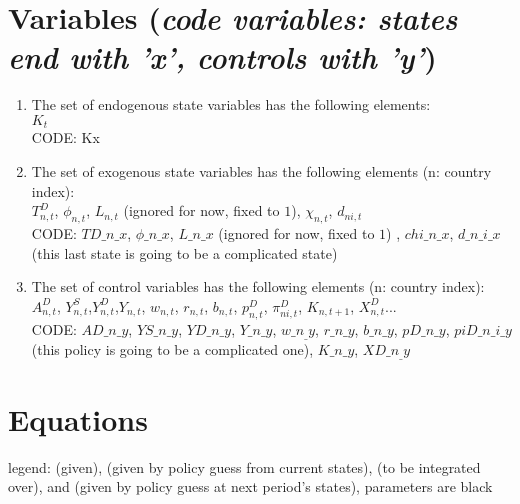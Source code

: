 \documentclass[11pt]{article}
\newcommand{\cl}[1]{{\color{orange}{#1}}}
\newcommand{\st}[1]{{\color{green}{#1}}}
\newcommand{\stnext}[1]{{\color{magenta}{#1}}}
\newcommand{\clnext}[1]{{\color{blue}{#1}}}
\begin{document}

\section{Variables (\emph{code variables: states end with 'x', controls with 'y'})}

\begin{enumerate}
	\item The set of endogenous state variables has the following elements: \\
	 $K_t$\\
	 CODE: Kx 
	\item The set of exogenous state variables has the following elements (n: country index): \\
	 $T^D_{n,t}$, $\phi_{n,t}$, $L_{n,t}$ (ignored for now, fixed to $1$),  $\chi_{n,t}$, $d_{ni,t}$ \\
	 CODE: $TD\_n\_x$, $\phi\_n\_x$, $L\_n\_x$ (ignored for now, fixed to $1$) , $chi\_n\_x$, $d\_n\_i\_x$ (this last state is going to be a complicated state) \\
	 \item The set of control variables has the following elements (n: country index): \\
	 $A_{n, t}^{D}$, $Y^S_{n,t}$,$Y^D_{n,t}$,$Y_{n,t}$, $w_{n,t}$, $r_{n,t}$, $b_{n,t}$, $p^D_{n,t}$, $\pi^D_{ni,t}$, $K_{n,t+1}$, $X^D_{n,t}$...\\
	 CODE: $AD\_n\_y$, $YS\_n\_y$, $YD\_n\_y$, $Y\_n\_y$, 
	 $w\_n_\_y$, $r\_n\_y$, $b\_n\_y$, $pD\_n\_y$, $piD\_n\_i\_y$ (this policy is going to be a complicated one), $K\_n\_y$, $XD\_n_\_y$     \\
\end{enumerate}



\section{Equations}

legend: \st{states in green} (given), \cl{controls in orange} (given by policy guess from current states), \stnext{next period's exogenous states in magenta} (to be integrated over), and \clnext{next period's controls in blue} (given by policy guess at next period's states), parameters are black\vspace{5mm}
\end{document}
